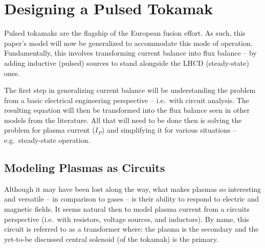 %
%
%
%
%
%
%
%

\chapter{Designing a Pulsed Tokamak}

\label{chapter:pulsed}

Pulsed tokamaks are the flagship of the European fusion  effort. As such, this paper's model will now be generalized to accommodate this mode of operation. Fundamentally, this involves transforming current balance into flux balance -- by adding inductive (pulsed) sources to stand alongside the LHCD (steady-state) ones.

The first step in generalizing current balance will be understanding the problem from a basic electrical engineering perspective -- i.e.\ with circuit analysis. The resulting equation will then be transformed into the flux balance seen in other models from the literature.\cite{process} All that will need to be done then is solving the problem for plasma current ($I_P$) and simplifying it for various situations -- e.g.\ steady-state operation.


\section{Modeling Plasmas as Circuits}

Although it may have been lost along the way, what makes plasmas so interesting and versatile -- in comparison to gases -- is their ability to respond to electric and magnetic fields. It seems natural then to model plasma current from a circuits perspective (i.e.\ with resistors, voltage sources, and inductors). By name, this circuit is referred to as a transformer where: the plasma is the secondary and the yet-to-be discussed central solenoid (of the tokamak) is the primary.


